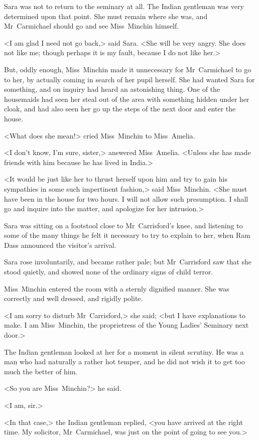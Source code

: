 Sara was not to return to the seminary at all. The Indian gentleman was very determined upon that point. She must remain where she was, and Mr~Carmichael should go and see Miss~Minchin himself.

<I am glad I need not go back,> said Sara. <She will be very angry. She does not like me; though perhaps it is my fault, because I do not like her.>

But, oddly enough, Miss~Minchin made it unnecessary for Mr~Carmichael to go to her, by actually coming in search of her pupil herself. She had wanted Sara for something, and on inquiry had heard an astonishing thing. One of the housemaids had seen her steal out of the area with something hidden under her cloak, and had also seen her go up the steps of the next door and enter the house.

<What does she mean!> cried Miss~Minchin to Miss~Amelia.

<I don't know, I'm sure, sister,> answered Miss~Amelia. <Unless she has made friends with him because he has lived in India.>

<It would be just like her to thrust herself upon him and try to gain his sympathies in some such impertinent fashion,> said Miss~Minchin. <She must have been in the house for two hours. I will not allow such presumption. I shall go and inquire into the matter, and apologize for her intrusion.>

Sara was sitting on a footstool close to Mr~Carrisford's knee, and listening to some of the many things he felt it necessary to try to explain to her, when Ram Dass announced the visitor's arrival.

Sara rose involuntarily, and became rather pale; but Mr~Carrisford saw that she stood quietly, and showed none of the ordinary signs of child terror.

Miss~Minchin entered the room with a sternly dignified manner. She was correctly and well dressed, and rigidly polite.

<I am sorry to disturb Mr~Carrisford,> she said; <but I have explanations to make. I am Miss~Minchin, the proprietress of the Young Ladies' Seminary next door.>

The Indian gentleman looked at her for a moment in silent scrutiny. He was a man who had naturally a rather hot temper, and he did not wish it to get too much the better of him.

<So you are Miss~Minchin?> he said.

<I am, sir.>

<In that case,> the Indian gentleman replied, <you have arrived at the right time. My solicitor, Mr~Carmichael, was just on the point of going to see you.>

